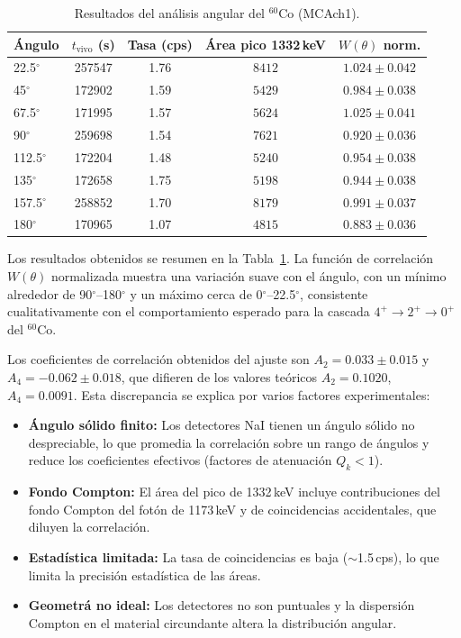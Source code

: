 \documentclass[12pt,a4paper]{article}
\begin{document}
\begin{table}[htbp]
\centering
\caption{Resultados del an\'alisis angular del $^{60}$Co (MCAch1).}
\label{tab:angular}
\begin{tabular}{lcccc}
\hline \hline
\'Angulo & $t_{\text{vivo}}$ (s) & Tasa (cps) & \'Area pico 1332\,keV & $W(\theta)$ norm. \\
\hline
22.5$^\circ$ & 257547 & 1.76 & $8412$ & $1.024 \pm 0.042$ \\
45$^\circ$   & 172902 & 1.59 & $5429$ & $0.984 \pm 0.038$ \\
67.5$^\circ$ & 171995 & 1.57 & $5624$ & $1.025 \pm 0.041$ \\
90$^\circ$   & 259698 & 1.54 & $7621$ & $0.920 \pm 0.036$ \\
112.5$^\circ$& 172204 & 1.48 & $5240$ & $0.954 \pm 0.038$ \\
135$^\circ$  & 172658 & 1.75 & $5198$ & $0.944 \pm 0.038$ \\
157.5$^\circ$& 258852 & 1.70 & $8179$ & $0.991 \pm 0.037$ \\
180$^\circ$  & 170965 & 1.07 & $4815$ & $0.883 \pm 0.036$ \\
\hline
\end{tabular}
\end{table}

Los resultados obtenidos se resumen en la Tabla~\ref{tab:angular}.
La funci\'on de correlaci\'on $W(\theta)$ normalizada muestra una variaci\'on
suave con el \'angulo, con un m\'inimo alrededor de 90$^\circ$--180$^\circ$ y
un m\'aximo cerca de 0$^\circ$--22.5$^\circ$, consistente cualitativamente
con el comportamiento esperado para la cascada $4^+ \to 2^+ \to 0^+$
del $^{60}$Co.

Los coeficientes de correlaci\'on obtenidos del ajuste son
$A_2 = 0.033 \pm 0.015$ y $A_4 = -0.062 \pm 0.018$, que difieren de los
valores te\'oricos $A_2 = 0.1020$, $A_4 = 0.0091$. Esta discrepancia se
explica por varios factores experimentales:
\begin{itemize}
  \item \textbf{\'Angulo s\'olido finito:} Los detectores NaI tienen un
        \'angulo s\'olido no despreciable, lo que promedia la correlaci\'on
        sobre un rango de \'angulos y reduce los coeficientes efectivos
        (factores de atenuaci\'on $Q_k < 1$).
  \item \textbf{Fondo Compton:} El \'area del pico de 1332\,keV incluye
        contribuciones del fondo Compton del fot\'on de 1173\,keV y de
        coincidencias accidentales, que diluyen la correlaci\'on.
  \item \textbf{Estad\'istica limitada:} La tasa de coincidencias es baja
        ($\sim$1.5\,cps), lo que limita la precisi\'on estad\'istica de
        las \'areas.
  \item \textbf{Geometr\'a no ideal:} Los detectores no son puntuales y
        la dispersi\'on Compton en el material circundante altera la
        distribuci\'on angular.
\end{itemize}
\end{document}
